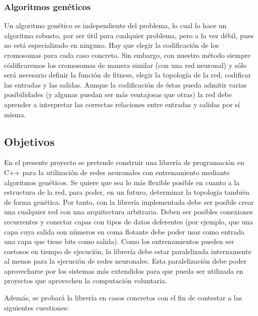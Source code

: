 \documentclass[a4paper,11pt]{article}
\begin{document}
\subsubsection{Algoritmos gen\'eticos}\label{anaFortYGene}

Un algoritmo gen\'etico es independiente del problema, lo cual lo hace un algoritmo robusto, por ser \'util para cualquier problema, pero a la vez d\'ebil, pues no est\'a especializado en ninguno. Hay que elegir la codificaci\'on de los cromosomas para cada caso concreto. Sin embargo, con nuestro m\'etodo siempre c\'odificaremos los cromosomas de manera similar (con una red neuronal) y s\'olo ser\'a necesario definir la funci\'on de fitness, elegir la topolog\'ia de la red, codificar las entradas y las salidas. Aunque la codificaci\'on de \'estas pueda admitir varias posibilidades (y algunas puedan ser m\'as ventajosas que otras) la red debe aprender a interpretar las correctas relaciones entre entradas y salidas por s\'i misma.

\subsection{Objetivos}\label{anaObjetivos}

En el presente proyecto se pretende construir una librer\'ia de programaci\'on
en C++ para la utilizaci\'on de redes neuronales con entrenamiento mediante
algoritmos gen\'eticos. Se quiere que sea lo m\'as flexible posible en cuanto a
la estructura de la red, para poder, en un futuro, determinar la topolog\'ia
tambi\'en de forma gen\'etica. Por tanto, con la librer\'ia implementada debe ser
posible crear una cualquier red con una arquitectura arbitraria. Deben ser
posibles conexiones recurrentes y conectar capas con tipos de datos
deferentes (por ejemplo, que una capa cuya salida son n\'umeros en coma flotante
debe poder usar como entrada una capa que tiene bits como salida).
 Como los entrenamientos pueden ser costosos en tiempo de ejecuci\'on, la librer\'ia debe estar paralelizada internamente al menos para la ejecuci\'on de redes neuronales. Esta paralelizaci\'on debe poder aprovecharse por los sistemas m\'as extendidos para que pueda ser utilizada en proyectos que aprovechen la computaci\'on voluntaria.

 Adem\'as, se probar\'a la librer\'ia en casos concretos con el fin de contestar a las siguientes cuestiones:
\end{document}
